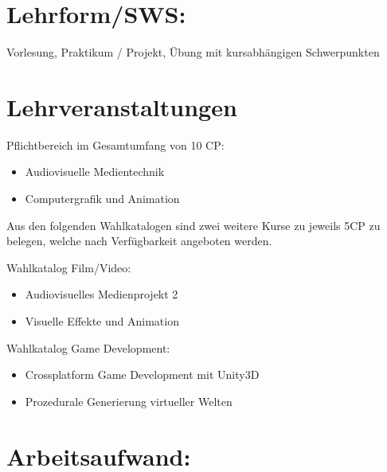 \section*{Lehrform/SWS:}\label{lehrformsws-25}

Vorlesung, Praktikum / Projekt, Übung mit kursabhängigen Schwerpunkten

\section*{Lehrveranstaltungen}\label{lehrveranstaltungen}

Pflichtbereich im Gesamtumfang von 10 CP:

\begin{itemize}
\tightlist
\item
  Audiovisuelle Medientechnik
\item
  Computergrafik und Animation
\end{itemize}

Aus den folgenden Wahlkatalogen sind zwei weitere Kurse zu jeweils 5CP
zu belegen, welche nach Verfügbarkeit angeboten werden.

Wahlkatalog Film/Video:

\begin{itemize}
\tightlist
\item
  Audiovisuelles Medienprojekt 2
\item
  Visuelle Effekte und Animation
\end{itemize}

Wahlkatalog Game Development:

\begin{itemize}
\tightlist
\item
  Crossplatform Game Development mit Unity3D
\item
  Prozedurale Generierung virtueller Welten
\end{itemize}

\section*{Arbeitsaufwand:}\label{arbeitsaufwand-24}


